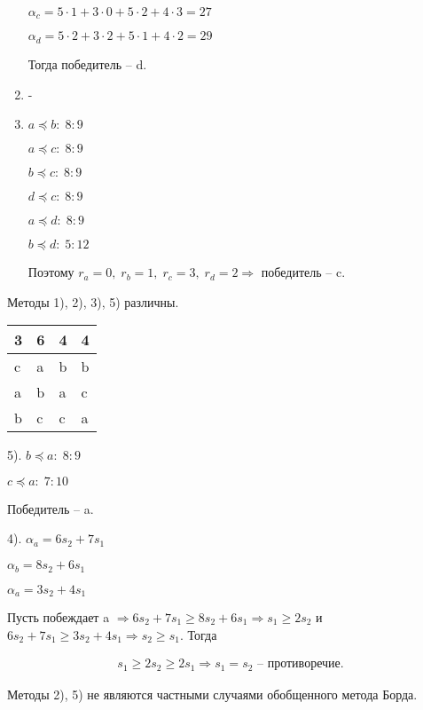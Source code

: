 \begin{example}
\begin{enumerate}
		$\alpha_c = 5 \cdot 1 + 3 \cdot 0 + 5 \cdot 2 + 4 \cdot 3 = 27$

		$\alpha_d = 5 \cdot 2 + 3 \cdot 2 + 5 \cdot 1 + 4 \cdot 2 = 29$\vspace{0.5cm}

		Тогда победитель -- d.

		\item -

		\item $a \preceq b: \; 8:9$

		$a \preceq c: \; 8:9$

		$b \preceq c: \; 8:9$

		$d \preceq c: \; 8:9$

		$a \preceq d: \; 8:9$

		$b \preceq d: \; 5:12$\vspace{0.5cm}

		Поэтому $r_a = 0, \; r_b = 1, \; r_c = 3, \; r_d = 2 \Rightarrow $ победитель -- c.

	\end{enumerate}	

	\begin{clair}
		Методы 1), 2), 3), 5) различны.
	\end{clair}
\end{example}\newpage

\begin{example}

	\begin{tabular}{ | l | l | l | l | }
		\hline
			3 & 6 & 4 & 4\\ \hline
			c & a & b & b\\
			a & b & a & c\\
			b & c & c & a\\
		\hline
	\end{tabular}\vspace{0.5cm}

	5). $b \preceq a: \; 8:9$

	$c \preceq a: \; 7:10$\vspace{0.5cm}

	Победитель -- a.\vspace{0.5cm}

	4). $\alpha_a = 6s_2 + 7s_1$

	$\alpha_b = 8s_2 + 6s_1$

	$\alpha_a = 3s_2 + 4s_1$\vspace{0.5cm}

	Пусть побеждает a $ \Rightarrow 6s_2 + 7s_1 \geq 8s_2 + 6s_1 \Rightarrow s_1 \geq 2s_2$ и $ 6s_2 + 7s_1 \geq 3s_2 + 4s_1 \Rightarrow s_2 \geq s_1.$ Тогда

	\begin{gather*}
		s_1 \geq 2s_2 \geq 2s_1 \Rightarrow s_1 = s_2 \text{ -- противоречие.}
	\end{gather*}

	\begin{clair}
		Методы 2), 5) не являются частными случаями обобщенного метода Борда.
	\end{clair}

\end{example}